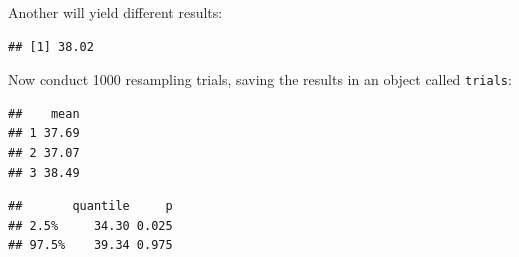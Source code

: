 Another will yield different results:
\begin{knitrout}
\color{fgcolor}\begin{kframe}
\begin{alltt}
\hlstd{(}\hlopt{~}  \hlstd{=}
\end{alltt}
\begin{verbatim}
## [1] 38.02
\end{verbatim}
\end{kframe}
\end{knitrout}

Now conduct 1000 resampling trials, saving the results in an object
called \texttt{trials}:
%
%
\begin{knitrout}
\color{fgcolor}\begin{kframe}
\begin{alltt}
 \hlkwb{<-} \hlstd{(}\hlstd{)} \hlopt{*} \hlstd{(}\hlopt{~}  \hlstd{=}
 \hlstd{)}
\end{alltt}
\begin{verbatim}
##    mean
## 1 37.69
## 2 37.07
## 3 38.49
\end{verbatim}
\begin{alltt}
\hlstd{(}\hlopt{~}  \hlstd{(}\hlstd{,} \hlstd{),} 
\end{alltt}
\begin{verbatim}
##       quantile     p
## 2.5%     34.30 0.025
## 97.5%    39.34 0.975
\end{verbatim}
\end{kframe}
\end{knitrout}
